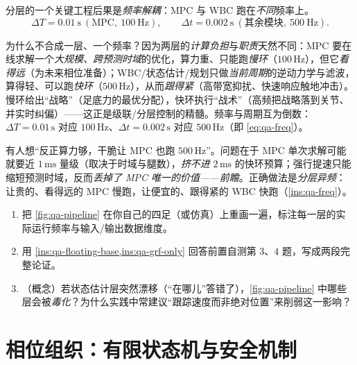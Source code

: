 分层的一个关键工程后果是\emph{频率解耦}：MPC 与 WBC 跑在\emph{不同}频率上\cite{yu2021quadruped}。
\begin{equation}
  \Delta T=0.01\ \text{s}\ (\text{MPC},\ 100\ \text{Hz}),
  \qquad
  \Delta t=0.002\ \text{s}\ (\text{其余模块},\ 500\ \text{Hz}).
  \label{eq:qa-freq}
\end{equation}

\begin{insight}\label{ins:qa-freq}
为什么不合成一层、一个频率？因为两层的\emph{计算负担}与\emph{职责}天然不同：MPC 要在线求解一个\emph{大规模、跨预测时域}的优化，算力重、只能跑\emph{慢环}（$100\,\mathrm{Hz}$），但它\emph{看得远}（为未来相位准备）；WBC/状态估计/规划只做\emph{当前周期}的逆动力学与滤波，算得轻、可以跑\emph{快环}（$500\,\mathrm{Hz}$），从而\emph{跟得紧}（高带宽抑扰、快速响应触地冲击）。慢环给出“战略”（足底力的最优分配），快环执行“战术”（高频把战略落到关节、并实时纠偏）——这正是级联/分层控制的精髓。频率与周期互为倒数：$\Delta T=0.01\,\mathrm{s}$ 对应 $100\,\mathrm{Hz}$、$\Delta t=0.002\,\mathrm{s}$ 对应 $500\,\mathrm{Hz}$（即 \cref{eq:qa-freq}）。
\end{insight}

\begin{pitfall}[误区：把所有环都拉到同一高频]
有人想“反正算力够，干脆让 MPC 也跑 $500\,\mathrm{Hz}$”。问题在于 MPC 单次求解可能就要近 $1\,\mathrm{ms}$ 量级（取决于时域与腿数），\emph{挤不进} $2\,\mathrm{ms}$ 的快环预算；强行提速只能缩短预测时域，反而\emph{丢掉了 MPC 唯一的价值——前瞻}。正确做法是\emph{分层异频}：让贵的、看得远的 MPC 慢跑，让便宜的、跟得紧的 WBC 快跑（\cref{ins:qa-freq}）。
\end{pitfall}

\begin{practice}
\begin{enumerate}
  \item 把 \cref{fig:qa-pipeline} 在你自己的四足（或仿真）上重画一遍，标注每一层的实际运行频率与输入/输出数据维度。
  \item 用 \cref{ins:qa-floating-base,ins:qa-grf-only} 回答前置自测第 $3$、$4$ 题，写成两段完整论证。
  \item （概念）若状态估计层突然漂移（“在哪儿”答错了），\cref{fig:qa-pipeline} 中哪些层会被\emph{毒化}？为什么实践中常建议“跟踪速度而非绝对位置”来削弱这一影响？
\end{enumerate}
\end{practice}

\section{相位组织：有限状态机与安全机制}
\label{sec:qa-fsm}

